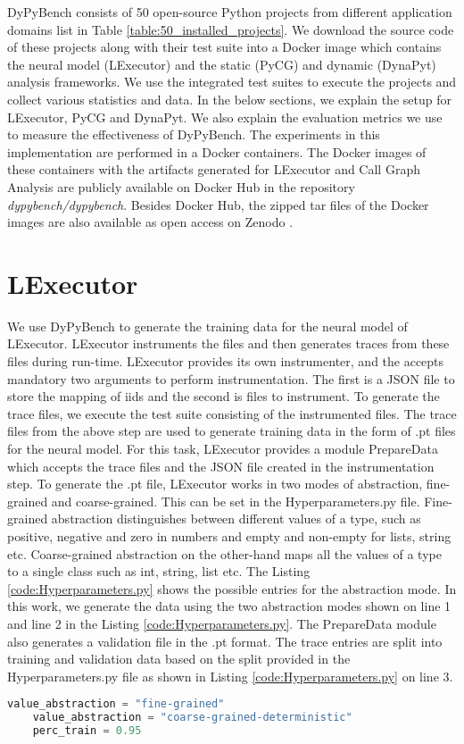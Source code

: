 DyPyBench consists of 50 open-source Python projects from different application domains list in Table \ref{table:50_installed_projects}.
We download the source code of these projects along with their test suite into a Docker image which contains the neural model (LExecutor) and the static (PyCG) and dynamic (DynaPyt) analysis frameworks.
We use the integrated test suites to execute the projects and collect various statistics and data.
In the below sections, we explain the setup for LExecutor, PyCG and DynaPyt.
We also explain the evaluation metrics we use to measure the effectiveness of DyPyBench.
The experiments in this implementation are performed in a Docker containers.
The Docker images of these containers with the artifacts generated for LExecutor and Call Graph Analysis are publicly available on Docker Hub in the repository \textit{dypybench/dypybench}.
Besides Docker Hub, the zipped tar files of the Docker images are also available as open access on Zenodo \cite{bajaj_piyush_2023_7887295,bajaj_piyush_2023_7892216}.

\section{LExecutor}
We use DyPyBench to generate the training data for the neural model of LExecutor.
LExecutor instruments the files and then generates traces from these files during run-time.
LExecutor provides its own instrumenter, and the accepts mandatory two arguments to perform instrumentation.
The first is a JSON file to store the mapping of iids and the second is files to instrument.
To generate the trace files, we execute the test suite consisting of the instrumented files.
The trace files from the above step are used to generate training data in the form of .pt files for the neural model.
For this task, LExecutor provides a module PrepareData which accepts the trace files and the JSON file created in the instrumentation step.
To generate the .pt file, LExecutor works in two modes of abstraction, fine-grained and coarse-grained.
This can be set in the Hyperparameters.py file.
Fine-grained abstraction distinguishes between different values of a type, such as positive, negative and zero in numbers and empty and non-empty for lists, string etc.
Coarse-grained abstraction on the other-hand maps all the values of a type to a single class such as int, string, list etc. \cite{LExecutor_2023}
The Listing \ref{code:Hyperparameters.py} shows the possible entries for the abstraction mode.
In this work, we generate the data using the two abstraction modes shown on line 1 and line 2 in the Listing \ref{code:Hyperparameters.py}. 
The PrepareData module also generates a validation file in the .pt format.
The trace entries are split into training and validation data based on the split provided in the Hyperparameters.py file as shown in Listing \ref{code:Hyperparameters.py} on line 3.
\begin{lstlisting}[caption=Abstraction Modes in LExecutor.,label=code:Hyperparameters.py,language=Python]
    value_abstraction = "fine-grained"
    value_abstraction = "coarse-grained-deterministic"
    perc_train = 0.95
\end{lstlisting}

